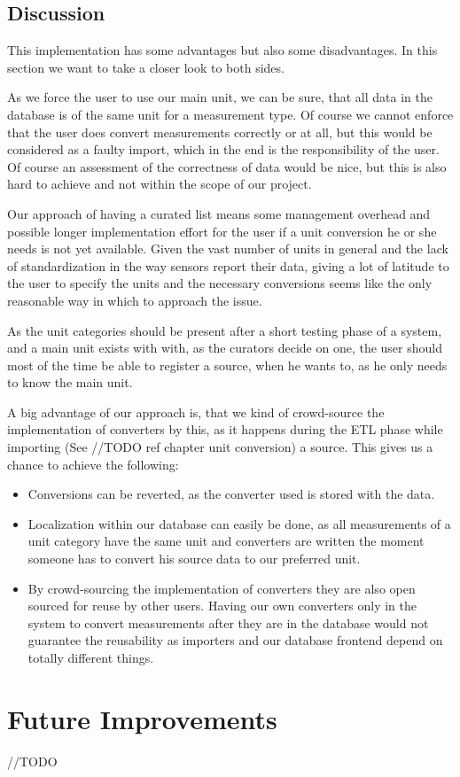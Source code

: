 \subsection{Discussion}\label{discussion}

This implementation has some advantages but also some disadvantages. In
this section we want to take a closer look to both sides.

As we force the user to use our main unit, we can be sure, that all data
in the database is of the same unit for a measurement type. Of course we
cannot enforce that the user does convert measurements correctly or at
all, but this would be considered as a faulty import, which in the end
is the responsibility of the user. Of course an assessment of the
correctness of data would be nice, but this is also hard to achieve and
not within the scope of our project.

Our approach of having a curated list means some management overhead and
possible longer implementation effort for the user if a unit conversion
he or she needs is not yet available. Given the vast number of units in
general and the lack of standardization in the way sensors report their
data, giving a lot of latitude to the user to specify the units and the
necessary conversions seems like the only reasonable way in which to
approach the issue.

As the unit categories should be present after a short testing phase of
a system, and a main unit exists with with, as the curators decide on
one, the user should most of the time be able to register a source, when
he wants to, as he only needs to know the main unit.

A big advantage of our approach is, that we kind of crowd-source the
implementation of converters by this, as it happens during the ETL phase
while importing (See //TODO ref chapter unit conversion) a source. This
gives us a chance to achieve the following:

\begin{itemize}
\tightlist
\item
  Conversions can be reverted, as the converter used is stored with the
  data.
\item
  Localization within our database can easily be done, as all
  measurements of a unit category have the same unit and converters are
  written the moment someone has to convert his source data to our
  preferred unit.
\item
  By crowd-sourcing the implementation of converters they are also open
  sourced for reuse by other users. Having our own converters only in
  the system to convert measurements after they are in the database
  would not guarantee the reusability as importers and our database
  frontend depend on totally different things.
\end{itemize}

\section{Future Improvements}\label{future-improvements}

//TODO
